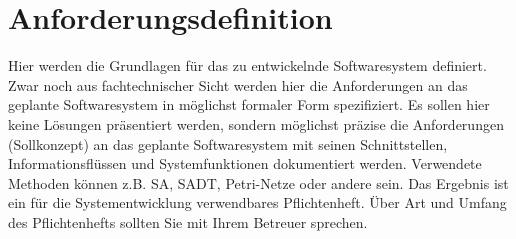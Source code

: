 \chapter{Anforderungsdefinition}
Hier werden die Grundlagen für das zu entwickelnde Softwaresystem definiert. Zwar noch aus fachtechnischer Sicht werden hier die Anforderungen an das geplante Softwaresystem in möglichst formaler Form spezifiziert. Es sollen hier keine Lösungen präsentiert werden, sondern möglichst präzise die Anforderungen (Sollkonzept) an das geplante Softwaresystem mit seinen Schnittstellen, Informationsflüssen und Systemfunktionen dokumentiert werden. Verwendete Methoden können z.B. SA, SADT, Petri-Netze oder andere sein.
Das Ergebnis ist ein für die Systementwicklung verwendbares Pflichtenheft. Über Art und Umfang des Pflichtenhefts sollten Sie mit Ihrem Betreuer sprechen.
